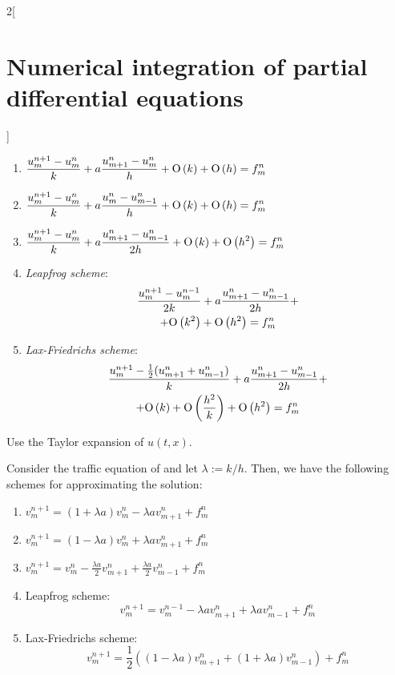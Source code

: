 \documentclass[../../../main_math.tex]{subfiles}
\begin{document}
\begin{multicols}{2}[\section{Numerical integration of partial differential equations}]
\begin{proposition}
\begin{enumerate}
      \item $\displaystyle\frac{u_m^{n+1}-u_m^n}{k}+a\frac{u_{m+1}^n-u_m^n}{h}+\mathrm{O}\left(k\right)+\mathrm{O}\left(h\right)=f_m^n$
      \item $\displaystyle\frac{u_m^{n+1}-u_m^n}{k}+a\frac{u_{m}^n-u_{m-1}^n}{h}+\mathrm{O}\left(k\right)+\mathrm{O}\left(h\right)=f_m^n$
      \item $\displaystyle\frac{u_m^{n+1}-u_m^n}{k}+a\frac{u_{m+1}^n-u_{m-1}^n}{2h}+\mathrm{O}\left(k\right)+\mathrm{O}\left(h^2\right)=f_m^n$
      \item \emph{Leapfrog scheme}:
            \begin{multline*}
              \frac{u_m^{n+1}-u_m^{n-1}}{2k}+a\frac{u_{m+1}^n-u_{m-1}^n}{2h}+\\+\mathrm{O}\left(k^2\right)+\mathrm{O}\left(h^2\right)=f_m^n
            \end{multline*}
      \item \emph{Lax-Friedrichs scheme}:
            \begin{multline*}
              \frac{u_m^{n+1}-\frac{1}{2}(u_{m+1}^n+u_{m-1}^n)}{k}+a\frac{u_{m+1}^n-u_{m-1}^n}{2h} + \\ + \mathrm{O}\left(k\right)+\mathrm{O}\left(\frac{h^2}{k}\right)+\mathrm{O}\left(h^2\right)=f_m^n
            \end{multline*}
    \end{enumerate}
  \end{proposition}
  \begin{sproof}
    Use the Taylor expansion of $u(t,x)$.
  \end{sproof}
  \begin{corollary}
    Consider the traffic equation of  and let $\lambda:=k/h$. Then, we have the following schemes for approximating the solution:
    \begin{enumerate}
      \item $\displaystyle v_m^{n+1}=(1+\lambda a)v_m^n-\lambda av_{m+1}^n+f_m^n$
      \item $\displaystyle v_m^{n+1}=(1-\lambda a)v_m^n+\lambda av_{m+1}^n+f_m^n$
      \item $\displaystyle v_m^{n+1}=v_m^n-\frac{\lambda a}{2}v_{m+1}^n+\frac{\lambda a}{2}v_{m-1}^n+f_m^n$
      \item Leapfrog scheme: $$v_m^{n+1}=v_m^{n-1}-\lambda av_{m+1}^n+\lambda av_{m-1}^n+f_m^n$$
      \item Lax-Friedrichs scheme: $$v_m^{n+1}=\frac{1}{2}\left((1-\lambda a)v_{m+1}^n+(1+\lambda a)v_{m-1}^n\right)+f_m^n$$
    \end{enumerate}
  \end{corollary}

\end{multicols}
\end{document}
